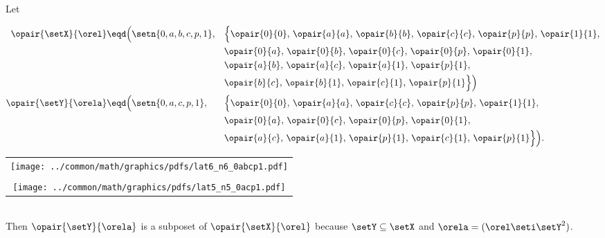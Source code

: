 \begin{example}
Let\\
\begin{minipage}{12\tw/16}%
\begin{align*}
  \opair{\setX}{\orel}
    &\eqd \Big( \setn{0,a,b,c,p,1},
    &&    \Big\{\opair{0}{0},\,\opair{a}{a},\,\opair{b}{b},\,\opair{c}{c},\,\opair{p}{p},\,\opair{1}{1},
  \\&&&   \opair{0}{a},\,\opair{0}{b},\,\opair{0}{c},\,\opair{0}{p},\,\opair{0}{1},
  \\&&&   \opair{a}{b},\,\opair{a}{c},\,\opair{a}{1},\,\opair{p}{1},
  \\&&&   \opair{b}{c},\,\opair{b}{1},\,\opair{c}{1},\,\opair{p}{1} \Big\}\Big)
  \\
  \opair{\setY}{\orela}
    &\eqd \Big( \setn{0,a,c,p,1},
    &&    \Big\{\opair{0}{0},\,\opair{a}{a},\,\opair{c}{c},\,\opair{p}{p},\,\opair{1}{1},
  \\&&&   \opair{0}{a},\,\opair{0}{c},\,\opair{0}{p},\,\opair{0}{1},
  \\&&&   \opair{a}{c},\,\opair{a}{1},\,\opair{p}{1},\,\opair{c}{1},\,\opair{p}{1} \Big\}\Big).
\end{align*}
\end{minipage}%
\begin{minipage}{4\tw/16}%
\begin{center}%
\begin{tabular}{c}%
   \texttt{[image: ../common/math/graphics/pdfs/lat6\_n6\_0abcp1.pdf]}
\\\\
  \texttt{[image: ../common/math/graphics/pdfs/lat5\_n5\_0acp1.pdf]}
\end{tabular}
\end{center}%
\end{minipage}
\\Then $\opair{\setY}{\orela}$ is a subposet of $\opair{\setX}{\orel}$ because
$\setY\subseteq\setX$ and $\orela=(\orel\seti\setY^2)$.
\end{example}

